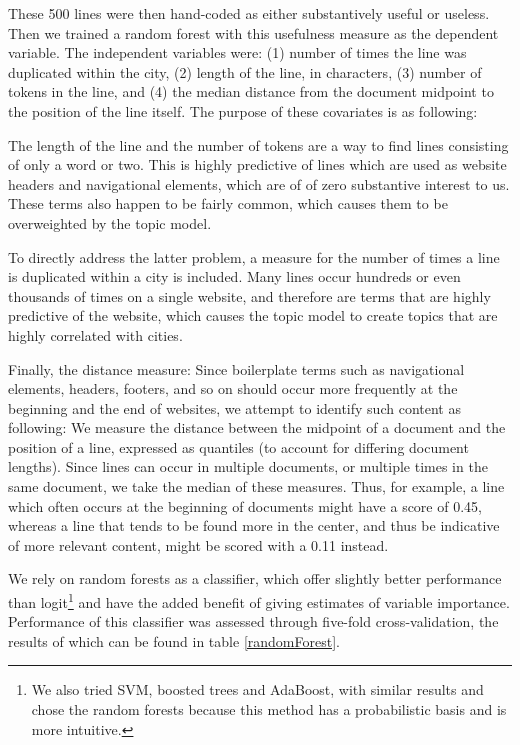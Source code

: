 \documentclass[11pt]{article}
\begin{document}
These 500 lines were then hand-coded as either substantively useful or useless. Then we trained a random forest with this usefulness measure as the dependent variable. The independent variables were: (1) number of times the line was duplicated within the city, (2) length of the line, in characters, (3) number of tokens in the line, and (4) the median distance from the document midpoint to the position of the line itself. The purpose of these covariates is as following:

The length of the line and the number of tokens are a way to find lines consisting of only a word or two. This is highly predictive of lines which are used as website headers and navigational elements, which are of of zero substantive interest to us. These terms also happen to be fairly common, which causes them to be overweighted by the topic model.

To directly address the latter problem, a measure for the number of times a line is duplicated within a city is included. Many lines occur hundreds or even thousands of times on a single website, and therefore are terms that are highly predictive of the website, which causes the topic model to create topics that are highly correlated with cities.

Finally, the distance measure: Since boilerplate terms such as navigational elements, headers, footers, and so on should occur more frequently at the beginning and the end of websites, we attempt to identify such content as following: We measure the distance between the midpoint of a document and the position of a line, expressed as quantiles (to account for differing document lengths). Since lines can occur in multiple documents, or multiple times in the same document, we take the median of these measures. Thus, for example, a line which often occurs at the beginning of documents might have a score of 0.45, whereas a line that tends to be found more in the center, and thus be indicative of more relevant content, might be scored with a 0.11 instead.

We rely on random forests as a classifier, which offer slightly better performance than logit\footnote{We also tried SVM, boosted trees and AdaBoost, with similar results and chose the random forests because this method has a probabilistic basis and is more intuitive.} and have the added benefit of giving estimates of variable importance. Performance of this classifier was assessed through five-fold cross-validation, the results of which can be found in table \ref{randomForest}.
\end{document}
